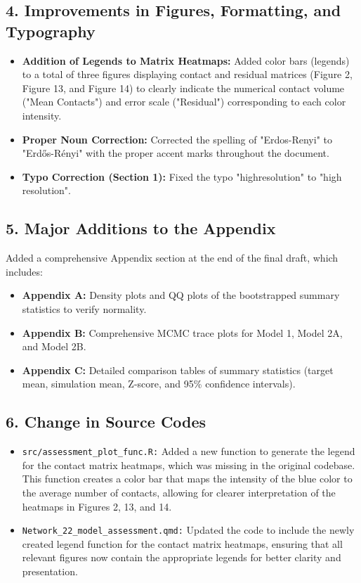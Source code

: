\subsection*{4. Improvements in Figures, Formatting, and Typography}
\begin{itemize}
    \item \textbf{Addition of Legends to Matrix Heatmaps:} Added color bars (legends) to a total of three figures displaying contact and residual matrices (Figure 2, Figure 13, and Figure 14) to clearly indicate the numerical contact volume ("Mean Contacts") and error scale ("Residual") corresponding to each color intensity.
    \item \textbf{Proper Noun Correction:} Corrected the spelling of "Erdos-Renyi" to "Erd\H{o}s-R\'{e}nyi" with the proper accent marks throughout the document.
    \item \textbf{Typo Correction (Section 1):} Fixed the typo "highresolution" to "high resolution".
\end{itemize}

\subsection*{5. Major Additions to the Appendix}
Added a comprehensive Appendix section at the end of the final draft, which includes:
\begin{itemize}
    \item \textbf{Appendix A:} Density plots and QQ plots of the bootstrapped summary statistics to verify normality.
    \item \textbf{Appendix B:} Comprehensive MCMC trace plots for Model 1, Model 2A, and Model 2B.
    \item \textbf{Appendix C:} Detailed comparison tables of summary statistics (target mean, simulation mean, Z-score, and 95\% confidence intervals).
\end{itemize}

\subsection*{6. Change in Source Codes}
\begin{itemize}
    \item \texttt{src/assessment\_plot\_func.R:} Added a new function to generate the legend for the contact matrix heatmaps, which was missing in the original codebase.
    This function creates a color bar that maps the intensity of the blue color to the average number of contacts, allowing for clearer interpretation of the heatmaps in Figures 2, 13, and 14. 
    \item \texttt{Network\_22\_model\_assessment.qmd:} Updated the code to include the newly created legend function for the contact matrix heatmaps, ensuring that all relevant figures now contain the appropriate legends for better clarity and presentation.
\end{itemize}